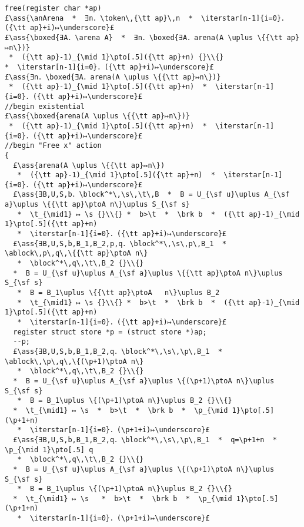 \documentclass[12pt,a4paper]{article}
\makeatletter
\newcommand{\ml}[2][t]{\mbox{\mdseries\begin{tabular}[#1]{@{}L@{}}#2\end{tabular}}}
\newcommand{\ass}[1]{\ensuremath{{\color{blue}\left\{\ml[c]{#1}\right\}}}}
\newcommand{\iterstar}[2][]{\text{\LARGE $*$}^{#1}_{#2}}
\makeatother
\begin{document}
\begin{lstlisting}
free(register char *ap) 
£\ass{\anArena  *  ∃n．\token\,{\tt ap}\,n  *  \iterstar[n-1]{i=0}．({\tt ap}+i)↦\underscore}£
£\ass{\boxed{∃A．\arena A}  *  ∃n．\boxed{∃A．arena(A \uplus \{{\tt ap}↦n\})} 
 *  ({\tt ap}-1)_{\mid 1}\pto[.5]({\tt ap}+n) {}\\{}
*  \iterstar[n-1]{i=0}．({\tt ap}+i)↦\underscore}£
£\ass{∃n．\boxed{∃A．arena(A \uplus \{{\tt ap}↦n\})} 
 *  ({\tt ap}-1)_{\mid 1}\pto[.5]({\tt ap}+n)  *  \iterstar[n-1]{i=0}．({\tt ap}+i)↦\underscore}£
//begin existential
£\ass{\boxed{arena(A \uplus \{{\tt ap}↦n\})} 
 *  ({\tt ap}-1)_{\mid 1}\pto[.5]({\tt ap}+n)  *  \iterstar[n-1]{i=0}．({\tt ap}+i)↦\underscore}£
//begin "Free x" action
{
  £\ass{arena(A \uplus \{{\tt ap}↦n\}) 
   *  ({\tt ap}-1)_{\mid 1}\pto[.5]({\tt ap}+n)  *  \iterstar[n-1]{i=0}．({\tt ap}+i)↦\underscore}£
  £\ass{∃B,U,S,b．\block^*\,\s\,\t\,B  *  B = U_{\sf u}\uplus A_{\sf a}\uplus \{{\tt ap}\ptoA n\}\uplus S_{\sf s} 
   *  \t_{\mid1} ↦ \s {}\\{} *  b>\t  *  \brk b  *  ({\tt ap}-1)_{\mid 1}\pto[.5]({\tt ap}+n) 
   *  \iterstar[n-1]{i=0}．({\tt ap}+i)↦\underscore}£
  £\ass{∃B,U,S,b,B_1,B_2,p,q．\block^*\,\s\,p\,B_1  *  \ablock\,p\,q\,\{{\tt ap}\ptoA n\} 
   *  \block^*\,q\,\t\,B_2 {}\\{}
  *  B = U_{\sf u}\uplus A_{\sf a}\uplus \{{\tt ap}\ptoA n\}\uplus S_{\sf s} 
   *  B = B_1\uplus \{{\tt ap}\ptoA   n\}\uplus B_2 
   *  \t_{\mid1} ↦ \s {}\\{} *  b>\t  *  \brk b  *  ({\tt ap}-1)_{\mid 1}\pto[.5]({\tt ap}+n) 
   *  \iterstar[n-1]{i=0}．({\tt ap}+i)↦\underscore}£
  register struct store *p = (struct store *)ap;
  --p;
  £\ass{∃B,U,S,b,B_1,B_2,q．\block^*\,\s\,\p\,B_1  *  \ablock\,\p\,q\,\{(\p+1)\ptoA n\} 
   *  \block^*\,q\,\t\,B_2 {}\\{}
  *  B = U_{\sf u}\uplus A_{\sf a}\uplus \{(\p+1)\ptoA n\}\uplus S_{\sf s} 
   *  B = B_1\uplus \{(\p+1)\ptoA n\}\uplus B_2 {}\\{}
  *  \t_{\mid1} ↦ \s  *  b>\t  *  \brk b  *  \p_{\mid 1}\pto[.5](\p+1+n) 
   *  \iterstar[n-1]{i=0}．(\p+1+i)↦\underscore}£
  £\ass{∃B,U,S,b,B_1,B_2,q．\block^*\,\s\,\p\,B_1  *  q=\p+1+n  *  \p_{\mid 1}\pto[.5] q 
   *  \block^*\,q\,\t\,B_2 {}\\{}
  *  B = U_{\sf u}\uplus A_{\sf a}\uplus \{(\p+1)\ptoA n\}\uplus S_{\sf s} 
   *  B = B_1\uplus \{(\p+1)\ptoA n\}\uplus B_2 {}\\{}
  *  \t_{\mid1} ↦ \s   *  b>\t  *  \brk b  *  \p_{\mid 1}\pto[.5](\p+1+n) 
   *  \iterstar[n-1]{i=0}．(\p+1+i)↦\underscore}£

\end{lstlisting}
\end{document}
